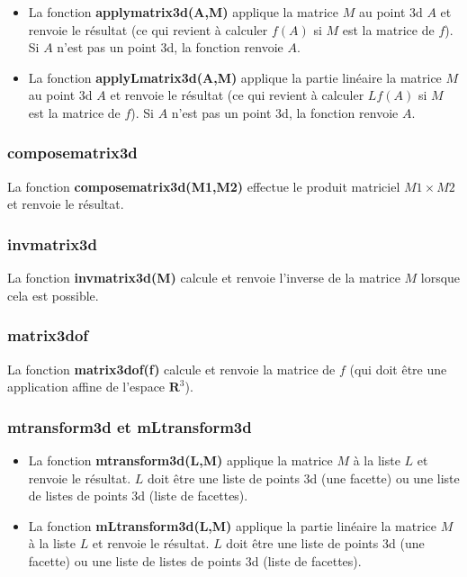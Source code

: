 \begin{itemize}
    \item La fonction \textbf{applymatrix3d(A,M)} applique la matrice $M$ au point 3d $A$ et renvoie le résultat (ce qui revient à calculer $f(A)$ si $M$ est la matrice de $f$). Si $A$ n'est pas un point 3d, la fonction renvoie $A$.
    
    \item La fonction \textbf{applyLmatrix3d(A,M)} applique la partie linéaire la matrice $M$ au point 3d $A$ et renvoie le résultat (ce qui revient à calculer $Lf(A)$ si $M$ est la matrice de $f$). Si $A$ n'est pas un point 3d, la fonction renvoie $A$.
\end{itemize}

\subsubsection{composematrix3d}
La fonction \textbf{composematrix3d(M1,M2)} effectue le produit matriciel $M1\times M2$ et renvoie le résultat.

\subsubsection{invmatrix3d}
La fonction \textbf{invmatrix3d(M)} calcule et renvoie l'inverse de la matrice $M$ lorsque cela est possible.

\subsubsection{matrix3dof}

La fonction \textbf{matrix3dof(f)} calcule et renvoie la matrice de $f$ (qui doit être une application affine de l'espace $\mathbf R^3$).


\subsubsection{mtransform3d et mLtransform3d}
\begin{itemize}
    \item La fonction \textbf{mtransform3d(L,M)} applique la matrice $M$ à la liste $L$ et renvoie le résultat. $L$ doit être une liste de points 3d (une facette) ou une liste de listes de points 3d (liste de facettes).
    \item La fonction \textbf{mLtransform3d(L,M)} applique la partie linéaire la matrice $M$ à la liste $L$ et renvoie le résultat. $L$ doit être une liste de points 3d (une facette) ou une liste de listes de points 3d (liste de facettes).
\end{itemize}

